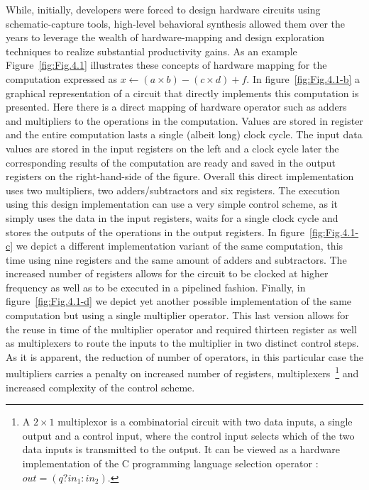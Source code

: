 While, initially, developers were forced to design hardware circuits using schematic-capture tools, high-level behavioral synthesis allowed them over the years to leverage the wealth of hardware-mapping and design exploration techniques to realize substantial productivity gains. 
As an example Figure~\ref{fig:Fig.4.1} illustrates these concepts of hardware mapping for the computation expressed as $x \gets (a \times b) - (c \times d) + f$. 
In figure~\ref{fig:Fig.4.1-b} a graphical representation of a circuit that directly implements this computation is presented. 
Here there is a direct mapping of hardware operator such as adders and multipliers to the operations in the computation. 
Values are stored in register and the entire computation lasts a single (albeit long) clock cycle. 
The input data values are stored in the input registers on the left and a clock cycle later the corresponding results of the computation are ready and saved in the output registers on the right-hand-side of the figure. 
Overall this direct implementation uses two multipliers, two adders/subtractors and six registers. 
The execution using this design implementation can use a very simple control scheme, as it simply uses the data in the input registers, waits for a single clock cycle and stores the outputs of the operations in the output registers. 
In figure~\ref{fig:Fig.4.1-c} we depict a different implementation variant of the same computation, this time using nine registers and the same amount of adders and subtractors. 
The increased number of registers allows for the circuit to be clocked at higher frequency as well as to be executed in a pipelined fashion. 
Finally, in figure~\ref{fig:Fig.4.1-d} we depict yet another possible implementation of the same computation but using a single multiplier operator. 
This last version allows for the reuse in time of the multiplier operator and required thirteen register as well as multiplexers to route the inputs to the multiplier in two distinct control steps. 
As it is apparent, the reduction of number of operators, in this particular case the multipliers carries a penalty on increased number of registers, multiplexers~\footnote{A $2\times1$ multiplexor is a combinatorial circuit with two data inputs, a single output and a control input, where the control input selects which of the two data inputs is transmitted to the output. 
  It can be viewed as a hardware implementation of the C programming language selection operator : 
  $\textit{out} = (q ? 
    \textit{in}_1 : 
    \textit{in}_2)$.} 
and increased complexity of the control scheme.\\

